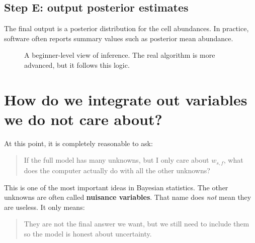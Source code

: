 \documentclass[11pt]{article}
\newcommand{\term}[1]{\textbf{#1}}
\begin{document}
\subsection{Step E: output posterior estimates}

The final output is a posterior distribution for the cell abundances. In practice, software often reports summary values such as posterior mean abundance.

\begin{figure}[H]
\centering
{}
\caption{A beginner-level view of inference. The real algorithm is more advanced, but it follows this logic.}
\end{figure}

\section{How do we integrate out variables we do not care about?}

At this point, it is completely reasonable to ask:

\begin{quote}
If the full model has many unknowns, but I only care about $w_{s,f}$, what does the computer actually do with all the other unknowns?
\end{quote}

This is one of the most important ideas in Bayesian statistics. The other unknowns are often called \term{nuisance variables}. That name does \emph{not} mean they are useless. It only means:

\begin{quote}
They are not the final answer we want, but we still need to include them so the model is honest about uncertainty.
\end{quote}
\end{document}
